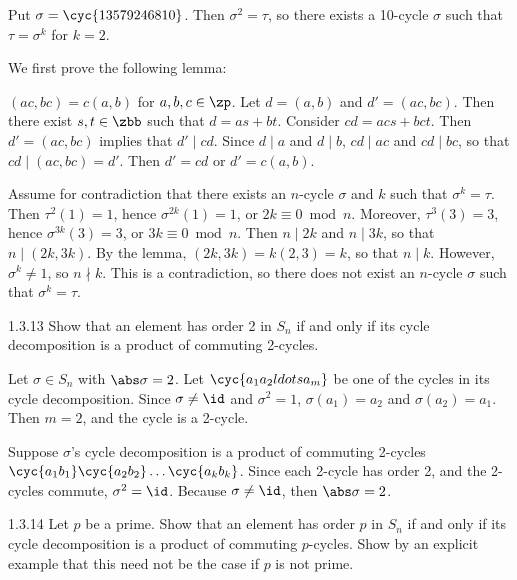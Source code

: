 \begin{solenum}
    \item Put $\sigma = \cyc{1 3 5 7 9 2 4 6 8 10}$.
	Then $\sigma^2 = \tau$, so there exists a 10-cycle $\sigma$ such that $\tau = \sigma^k$ for $k = 2$.
    \item We first prove the following lemma:
    \begin{lemma}{$(ac, bc) = c(a, b)$ for $a, b, c \in \zp$.}
        Let $d = (a, b)$ and $d' = (ac, bc)$.
	Then there exist $s, t \in \zbb$ such that $d = as + bt$.
	Consider $cd = acs + bct$.
	Then $d' = (ac, bc)$ implies that $d' \mid cd$.
	Since $d \mid a$ and $d \mid b$, $cd \mid ac$ and $cd \mid bc$, so that $cd \mid (ac, bc) = d'$.
	Then $d' = cd$ or $d' = c(a, b)$.
    \end{lemma}
    
    Assume for contradiction that there exists an $n$-cycle $\sigma$ and $k$ such that $\sigma^k = \tau$.
	Then $\tau^2(1) = 1$, hence $\sigma^{2k}(1) = 1$, or $2k \equiv 0 \bmod n$.
	Moreover, $\tau^3(3) = 3$, hence $\sigma^{3k}(3) = 3$, or $3k \equiv 0 \bmod n$.
	Then $n \mid 2k$ and $n \mid 3k$, so that $n \mid (2k, 3k)$.
	By the lemma, $(2k, 3k) = k(2, 3) = k$, so that $n \mid k$.
	However, $\sigma^k \neq 1$, so $n \nmid k$.
	This is a contradiction, so there does not exist an $n$-cycle $\sigma$ such that $\sigma^k = \tau$.
\end{solenum}

\begin{exercise}{1.3.13}
    Show that an element has order 2 in $S_n$ if and only if its cycle decomposition is a product of commuting 2-cycles.
\end{exercise}

\begin{soliff}
    \rightimp Let $\sigma \in S_n$ with $\abs\sigma = 2$.
	Let $\cyc{a_1 a_2 ldots a_m}$ be one of the cycles in its cycle decomposition.
	Since $\sigma \neq \id$ and $\sigma^2 = 1$, $\sigma(a_1) = a_2$ and $\sigma(a_2) = a_1$.
	Then $m = 2$, and the cycle is a 2-cycle.

    \leftimp Suppose $\sigma$'s cycle decomposition is a product of commuting 2-cycles $\cyc{a_1 b_1}\cyc{a_2 b_2} \ldots \cyc{a_k b_k}$.
	Since each 2-cycle has order 2, and the 2-cycles commute, $\sigma^2 = \id$.
	Because $\sigma \neq \id$, then $\abs\sigma = 2$.
\end{soliff}

\begin{exercise}{1.3.14}
    Let $p$ be a prime.
	Show that an element has order $p$ in $S_n$ if and only if its cycle decomposition is a product of commuting $p$-cycles.
	Show by an explicit example that this need not be the case if $p$ is not prime.
\end{exercise}

